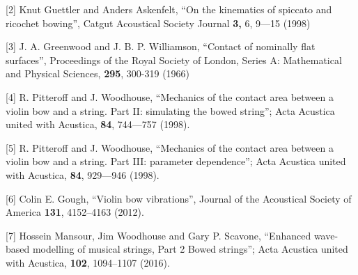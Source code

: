   [2] Knut Guettler and Anders Askenfelt, “On the kinematics of spiccato and 
  ricochet bowing”, Catgut Acoustical Society Journal \textbf{3,} 6, 9—15 
  (1998) 

  [3] J. A. Greenwood and J. B. P. Williamson, “Contact of nominally flat 
  surfaces”, Proceedings of the Royal Society of London, Series A: Mathematical 
  and Physical Sciences, \textbf{295}, 300-319 (1966) 

  [4] R. Pitteroff and J. Woodhouse, “Mechanics of the contact area between a 
  violin bow and a string. Part II: simulating the bowed string”; Acta Acustica 
  united with Acustica, \textbf{84}, 744—757 (1998). 

  [5] R. Pitteroff and J. Woodhouse, “Mechanics of the contact area between a 
  violin bow and a string. Part III: parameter dependence”; Acta Acustica 
  united with Acustica, \textbf{84}, 929—946 (1998). 

  [6] Colin E. Gough, ``Violin bow vibrations'', Journal of the Acoustical 
  Society of America \textbf{131}, 4152--4163 (2012). 

  [7] Hossein Mansour, Jim Woodhouse and Gary P. Scavone, “Enhanced wave-based 
  modelling of musical strings, Part 2 Bowed strings”; Acta Acustica united 
  with Acustica, \textbf{102}, 1094–1107 (2016). 